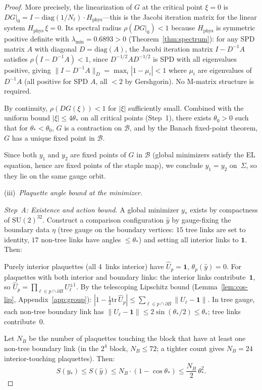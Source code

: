 \documentclass[11pt]{article}
\theoremstyle{definition}
\newcommand{\SU}{\mathrm{SU}}
\newcommand{\tr}{\mathrm{tr}}
\begin{document}
\begin{proof}
More precisely, the linearization of $G$ at the critical
point $\xi=0$ is
$DG|_0=I-\mathrm{diag}(1/N_\ell)\cdot H_{\mathrm{phys}}$---this
is the Jacobi iteration
matrix for the linear system $H_{\mathrm{phys}}\,\xi=0$.
Its spectral radius $\rho(DG|_0)<1$ because
$H_{\mathrm{phys}}$ is symmetric positive definite with
$\lambda_{\min}=0.6893>0$ (Theorem~\ref{thm:spectrum}):
for any SPD matrix $A$ with diagonal $D=\mathrm{diag}(A)$,
the Jacobi iteration matrix $I-D^{-1}A$ satisfies
$\rho(I-D^{-1}A)<1$, since $D^{-1/2}AD^{-1/2}$ is SPD
with all eigenvalues positive, giving
$\|I-D^{-1}A\|_{D}=\max_i|1-\mu_i|<1$ where
$\mu_i$ are eigenvalues of $D^{-1}A$
(all positive for SPD $A$, all $<2$ by Gershgorin).
No M-matrix structure is required.

By continuity, $\rho(DG(\xi))<1$ for $|\xi|$ sufficiently
small.  Combined with the uniform bound $|\xi|\le 4\theta_*$
on all critical points (Step~1), there exists
$\theta_0>0$ such that for $\theta_*<\theta_0$,
$G$ is a contraction on $\mathcal{B}$, and by the Banach
fixed-point theorem, $G$ has a unique fixed point in
$\mathcal{B}$.

Since both $y_1$ and $y_2$ are fixed points of $G$ in
$\mathcal{B}$ (global minimizers satisfy the EL equation,
hence are fixed points of the staple map), we conclude
$y_1=y_2$ on~$\Sigma$, so they lie on the same gauge orbit.

(iii)~\emph{Plaquette angle bound at the minimizer.}

\emph{Step~A: Existence and action bound.}
A global minimizer $y_*$ exists by compactness of $\SU(2)^{32}$.
Construct a comparison configuration $\hat{y}$ by gauge-fixing
the boundary data $\eta$ (tree gauge on the boundary vertices:
$15$ tree links are set to identity, $17$ non-tree links
have angles $\le\theta_*$) and setting all interior links to
$\mathbf{1}$.  Then:

Purely interior plaquettes (all 4~links interior) have
$\hat{U}_p=\mathbf{1}$, $\theta_p(\hat{y})=0$.
For plaquettes with both interior and boundary links: the
interior links contribute~$\mathbf{1}$, so
$\hat{U}_p=\prod_{\ell\in p\cap\partial B}U_\ell^{\pm 1}$.
By the telescoping Lipschitz bound (Lemma~\ref{lem:cos-lip},
Appendix~\ref{app:group}): $|1-\frac{1}{2}\tr\,\hat{U}_p|
\le\sum_{\ell\in p\cap\partial B}\|U_\ell-\mathbf{1}\|$.
In tree gauge, each non-tree boundary link has
$\|U_\ell-\mathbf{1}\|\le 2\sin(\theta_*/2)\le\theta_*$;
tree links contribute~$0$.

Let $N_B$ be the number of plaquettes touching the block
that have at least one non-tree boundary link (in the $2^4$
block, $N_B\le 72$; a tighter count gives $N_B=24$
interior-touching plaquettes).  Then:
\begin{equation}\label{eq:action-compare}
S(y_*)\le S(\hat{y})\le N_B\cdot(1-\cos\theta_*)
\le\frac{N_B}{2}\,\theta_*^2.
\end{equation}


\end{proof}
\end{document}
